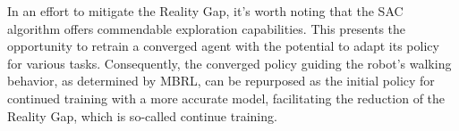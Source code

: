 In an effort to mitigate the Reality Gap, it's worth noting that the SAC algorithm offers commendable exploration capabilities. This presents the opportunity to retrain a converged agent with the potential to adapt its policy for various tasks. Consequently, the converged policy guiding the robot's walking behavior, as determined by MBRL, can be repurposed as the initial policy for continued training with a more accurate model, facilitating the reduction of the Reality Gap, which is so-called continue training.